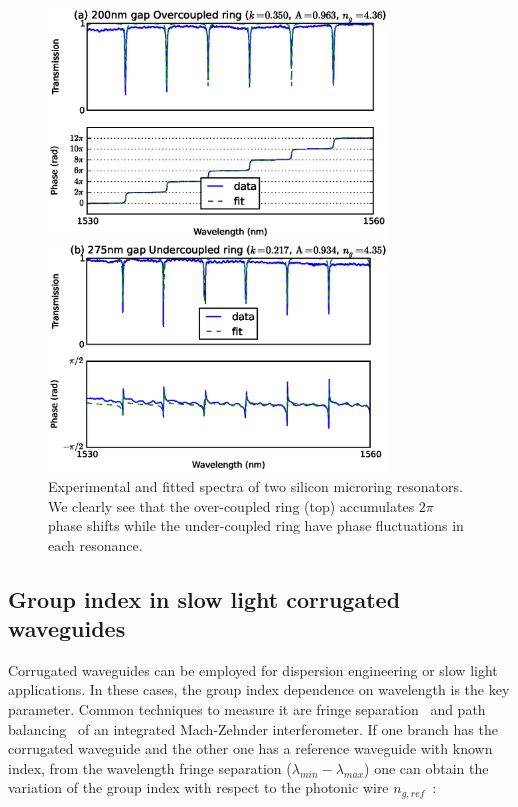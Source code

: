 \documentclass[journal]{IEEEtran}
\begin{document}
\begin{figure}[htb]
  \centerline{\includegraphics[width=9cm]{r20g200TE_fitPhaseAmp}}
  \centerline{\includegraphics[width=9cm]{r20g275TE_fitPhaseAmp}}
  \caption{Experimental and fitted spectra of two silicon microring resonators. We clearly see that the over-coupled ring (top) accumulates $2\pi$ phase shifts while the under-coupled ring have phase fluctuations in each resonance. }
  \label{fig:overcoupled} %
\end{figure}

\subsection{Group index in slow light corrugated waveguides}
\label{sec:corrWaveguides}
Corrugated waveguides can be employed for dispersion engineering or slow light applications. In these cases, the group index dependence on wavelength is the key parameter. Common techniques to measure it are fringe separation~\cite{shang81,vlasov:05,yao:811,Dulkeith2006} and path balancing~\cite{Cohen:82,Knox:88,Liang:98} of an integrated Mach-Zehnder interferometer. If one branch has the corrugated waveguide and the other one has a reference waveguide with known index, from the wavelength fringe separation ($ \lambda_{min} - \lambda_{max} $) one can obtain the variation of the group index with respect to the photonic wire $ n_{g,ref} $~\cite{vlasov:05}:
\end{document}
